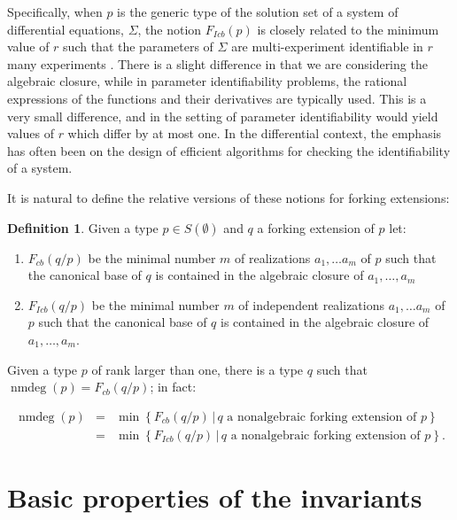 \documentclass[11pt]{amsart}
\def\nmdeg{\mathop{\rm nmdeg}}
\def\nmdeg{\operatorname{nmdeg}}
\newcommand{\fcb}[1]{F_{cb}\left( #1  \right)}
\newcommand{\ficb}[1]{F_{Icb}\left( #1  \right)}
\theoremstyle{definition}
\newtheorem{definition}[theorem]{Definition}
\theoremstyle{remark}
\numberwithin{equation}{section}
\begin{document}
Specifically, when $p$ is the generic type of the solution set of a system of differential equations, $\Sigma$, the notion $\ficb{p}$ is closely related to the minimum value of $r$ such that the parameters of $\Sigma$ are multi-experiment identifiable in $r$ many experiments \cite[Section 2.2]{ovchinnikov2022multi}. There is a slight difference in that we are considering the algebraic closure, while in parameter identifiability problems, the rational expressions of the functions and their derivatives are typically used. This is a very small difference, and in the setting of parameter identifiability would yield values of $r$ which differ by at most one. In the differential context, the emphasis has often been on the design of efficient algorithms for checking the identifiability of a system.

It is natural to define the relative versions of these notions for forking extensions: 

\begin{definition} \label{cbrkdef} Given a type $p \in S( \emptyset )$ and $q$ a forking extension of $p$ let: 

\begin{enumerate}
 \item $\fcb{q/p}$ be the minimal number $m$ of realizations $a_1, \ldots a_m$  of $p$ such that the canonical base of $q$ is contained in the algebraic closure of $a_1, \ldots , a_m$
\item $\ficb{q/p}$ be the minimal number $m$ of independent realizations $a_1, \ldots a_m$  of $p$ such that the canonical base of $q$ is contained in the algebraic closure of $a_1, \ldots , a_m$.
\end{enumerate}
\end{definition}

Given a type $p$ of rank larger than one, there is a type $q$ such that $\nmdeg (p) = \fcb {q/p}$; in fact: 

\begin{eqnarray*}
\nmdeg(p) &=& \min \left\{\fcb {q/p} \, | \, q \text{ a nonalgebraic forking extension of }p \right\} \\
&=& \min \left\{\ficb {q/p} \, | \, q \text{ a nonalgebraic forking extension of }p \right\}.
\end{eqnarray*}




\section{Basic properties of the invariants} \label{Thebasics}
\end{document}
